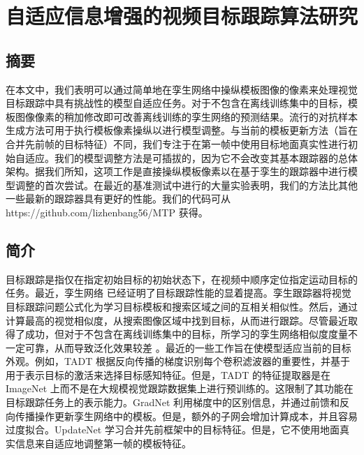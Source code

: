 \chapter{自适应信息增强的视频目标跟踪算法研究}\label{chap:MTP}

\section{摘要}
在本文中，我们表明可以通过简单地在孪生网络中操纵模板图像的像素来处理视觉目标跟踪中具有挑战性的模型自适应任务。对于不包含在离线训练集中的目标，模板图像像素的稍加修改即可改善离线训练的孪生网络的预测结果。流行的对抗样本生成方法可用于执行模板像素操纵以进行模型调整。与当前的模板更新方法（旨在合并先前帧的目标特征）不同，我们专注于在第一帧中使用目标地面真实性进行初始自适应。我们的模型调整方法是可插拔的，因为它不会改变其基本跟踪器的总体架构。据我们所知，这项工作是直接操纵模板像素以在基于孪生的跟踪器中进行模型调整的首次尝试。在最近的基准测试中进行的大量实验表明，我们的方法比其他一些最新的跟踪器具有更好的性能。我们的代码可从 https://github.com/lizhenbang56/MTP 获得。

\section{简介}
目标跟踪是指仅在指定初始目标的初始状态下，在视频中顺序定位指定运动目标的任务。最近，孪生网络 \cite{danelljan2019atom, SiamFC} 已经证明了目标跟踪性能的显着提高。孪生跟踪器将视觉目标跟踪问题公式化为学习目标模板和搜索区域之间的互相关相似性。然后，通过计算最高的视觉相似度，从搜索图像区域中找到目标，从而进行跟踪。尽管最近取得了成功，但对于不包含在离线训练集中的目标，所学习的孪生网络相似度度量不一定可靠，从而导致泛化效果较差 \cite{Bhat_2019_ICCV}。最近的一些工作旨在使模型适应当前的目标外观。例如，TADT \cite{Li_2019_CVPR} 根据反向传播的梯度识别每个卷积滤波器的重要性，并基于用于表示目标的激活来选择目标感知特征。但是，TADT 的特征提取器是在 ImageNet \cite{VID} 上而不是在大规模视觉跟踪数据集上进行预训练的。这限制了其功能在目标跟踪任务上的表示能力。GradNet \cite{Li_2019_ICCV} 利用梯度中的区别信息，并通过前馈和反向传播操作更新孪生网络中的模板。但是，额外的子网会增加计算成本，并且容易过度拟合。UpdateNet \cite{Zhang_2019_ICCV} 学习合并先前框架中的目标特征。但是，它不使用地面真实信息来自适应地调整第一帧的模板特征。

